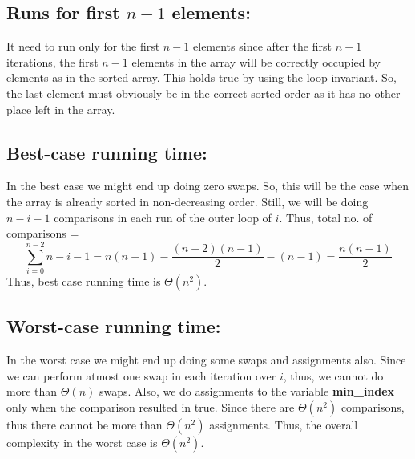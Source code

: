 \documentclass[12pt]{report}
\begin{document}
\subsection{Runs for first $n - 1$ elements:}
It need to run only for the first $n - 1$ elements since after the first $n - 1$ iterations, the first $n - 1$ elements in the array will be correctly occupied by elements as in the sorted array. This holds true by using the loop invariant. So, the last element must obviously be in the correct sorted order as it has no other place left in the array. 

\subsection{Best-case running time:}
In the best case we might end up doing zero swaps. So, this will be the case when the array is already sorted in non-decreasing order. Still, we will be doing $n - i - 1$ comparisons in each run of the outer loop of $i$. Thus, total no. of comparisons = 
\[\sum_{i = 0}^{n - 2} n - i - 1 = n(n - 1) - \frac{(n - 2)(n - 1)}{2} - (n - 1) = \frac{n(n - 1)}{2}\]
Thus, best case running time is $\Theta(n^{2})$.

\subsection{Worst-case running time:}
In the worst case we might end up doing some swaps and assignments also. Since we can perform atmost one swap in each iteration over $i$, thus, we cannot do more than $\Theta(n)$ swaps. Also, we do assignments to the variable \textbf{min\_index} only when the comparison resulted in true. Since there are $\Theta(n^{2})$ comparisons, thus there cannot be more than $\Theta(n^{2})$ assignments. Thus, the overall complexity in the worst case is $\Theta(n^{2})$.

\end{document}
